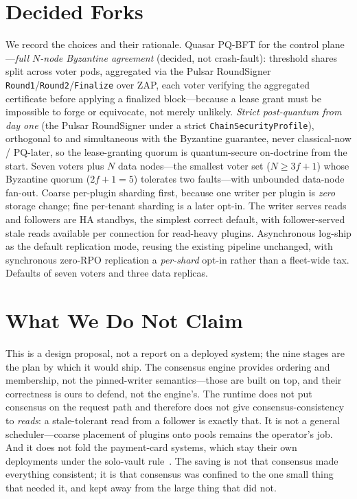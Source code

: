 \documentclass[11pt]{article}
\begin{document}
\section{Decided Forks}
\label{sec:forks}

We record the choices and their rationale. Quasar PQ-BFT for the control
plane---\emph{full $N$-node Byzantine agreement} (decided, not crash-fault):
threshold shares split across voter pods, aggregated via the Pulsar RoundSigner
\texttt{Round1}/\texttt{Round2}/\texttt{Finalize} over ZAP, each voter
verifying the aggregated certificate before applying a finalized block---because
a lease grant must be impossible to forge or equivocate, not merely unlikely.
\emph{Strict post-quantum from day one} (the Pulsar RoundSigner under a strict
\texttt{ChainSecurityProfile}), orthogonal to and simultaneous with the
Byzantine guarantee, never classical-now / PQ-later, so the lease-granting
quorum is quantum-secure on-doctrine from the start. Seven
voters plus $N$ data nodes---the smallest voter set ($N \ge 3f+1$) whose
Byzantine quorum ($2f+1 = 5$) tolerates two faults---with unbounded data-node fan-out.
Coarse per-plugin sharding first, because one writer per plugin is
\emph{zero} storage change; fine per-tenant sharding is a later opt-in. The
writer serves reads and followers are HA standbys, the simplest correct
default, with follower-served stale reads available per connection for
read-heavy plugins. Asynchronous log-ship as the default replication mode,
reusing the existing pipeline unchanged, with synchronous zero-RPO
replication a \emph{per-shard} opt-in rather than a fleet-wide tax. Defaults
of seven voters and three data replicas.

\section{What We Do Not Claim}
\label{sec:notclaim}

This is a design proposal, not a report on a deployed system; the nine stages
are the plan by which it would ship. The consensus engine provides ordering
and membership, not the pinned-writer semantics---those are built on top, and
their correctness is ours to defend, not the engine's. The runtime does not
put consensus on the request path and therefore does not give
consensus-consistency to \emph{reads}: a stale-tolerant read from a follower
is exactly that. It is not a general scheduler---coarse placement of plugins
onto pools remains the operator's job. And it does not fold the payment-card
systems, which stay their own deployments under the solo-vault
rule~\cite{hip0106}. The saving is not that consensus made everything
consistent; it is that consensus was confined to the one small thing that
needed it, and kept away from the large thing that did not.
\end{document}

